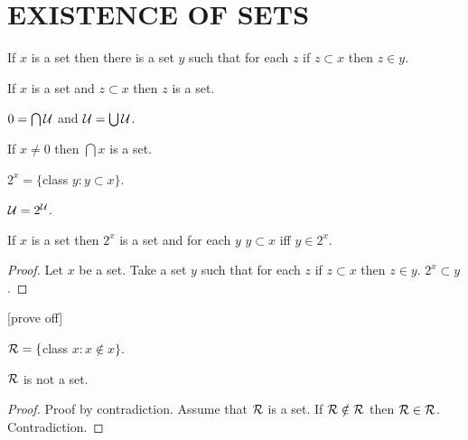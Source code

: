 \documentclass[a4paper,draft]{amsproc}
\begin{document}
\section{EXISTENCE OF SETS}
\begin{forthel}

\begin{axiom}[II]
If $x$ is a set then there is a set $y$ such that for each
$z$ if $z \subset x$ then $z \in y$.
\end{axiom}


\begin{theorem}[33]
If $x$ is a set and $z \subset x$ then $z$ is a set.
\end{theorem}

\begin{theorem}[34]
$0 = \bigcap \cal{U}$ and $\cal{U} = \bigcup \cal{U}$.
\end{theorem}

\begin{theorem}[35]
If $x \neq 0$ then $\bigcap x$ is a set.
\end{theorem}

\begin{definition}[36]
$2^{x} = \{$class $y : y \subset x\}$.
\end{definition}

\begin{theorem}[37]
$\cal{U} = 2^{\cal{U}}$.
\end{theorem}

\begin{theorem}[38]
If $x$ is a set then $2^{x}$ is a set and for each $y$  $y \subset x$ iff $y \in 2^{x}$.
\end{theorem}
\begin{proof} Let $x$ be a set.
Take a set $y$ such that for each $z$ 
if $z \subset x$ then $z \in y$.
$2^{x} \subset y$.
\end{proof}

[prove off]
\begin{definition}
$\cal{R} = \{$class $x : x \notin x\}$.
\end{definition}

\begin{theorem}
$\cal{R}$ is not a set.
\end{theorem}
\begin{proof}
Proof by contradiction.
Assume that $\cal{R}$ is a set.
If $\cal{R} \notin \cal{R}$ then $\cal{R} \in \cal{R}$.
Contradiction.
\end{proof}


\end{forthel}
\end{document}
